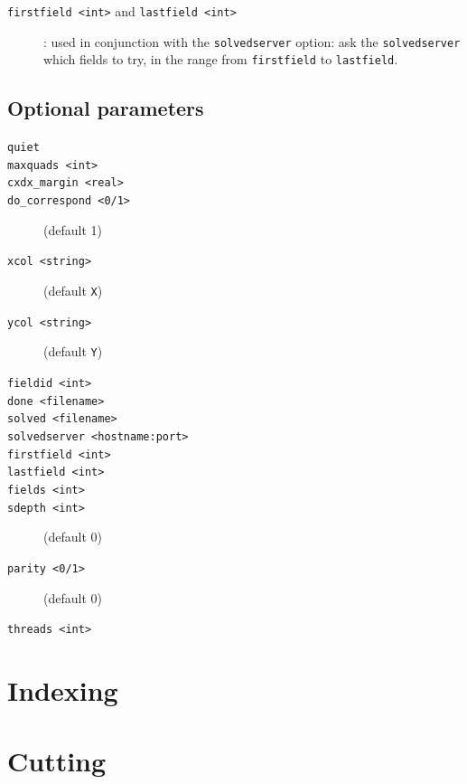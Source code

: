\documentclass[12pt,letterpaper,titlepage]{article}
\newcommand{\code}[1]{\texttt{#1}}
\begin{document}
\begin{description}
\item[\code{firstfield <int>} and \code{lastfield <int>}]: used in conjunction
  with the \code{solvedserver} option: ask the \code{solvedserver} which fields
  to try, in the range from \code{firstfield} to \code{lastfield}.
\end{description}

\subsection{Optional parameters}
\begin{description}
\item[\code{quiet}]
\item[\code{maxquads <int>}]
\item[\code{cxdx\_margin <real>}]
\item[\code{do\_correspond <0/1>}] (default 1)
\item[\code{xcol <string>}] (default \code{X})
\item[\code{ycol <string>}] (default \code{Y})
\item[\code{fieldid <int>}]
\item[\code{done <filename>}]
\item[\code{solved <filename>}]
\item[\code{solvedserver <hostname:port>}]
\item[\code{firstfield <int>}]
\item[\code{lastfield <int>}]
\item[\code{fields <int>}]
\item[\code{sdepth <int>}] (default 0)
\item[\code{parity <0/1>}] (default 0)
\item[\code{threads <int>}]
\end{description}

\section{Indexing}

\section{Cutting}
\end{document}
